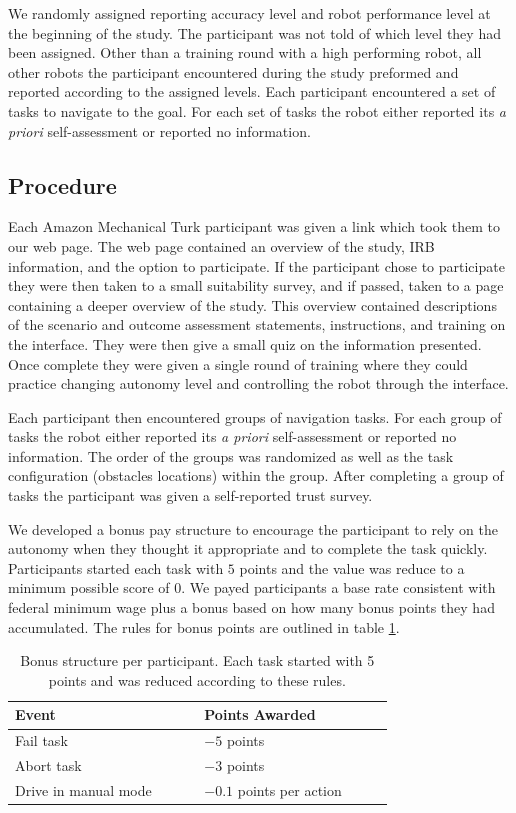 \documentclass[aaai]{article}
\begin{document}
We randomly assigned reporting accuracy level and robot performance level at the beginning of the study. The participant was not told of which level they had been assigned. Other than a training round with a high performing robot, all other robots the participant encountered during the study preformed and reported according to the assigned levels. Each participant encountered a set of tasks to navigate to the goal. For each set of tasks the robot either reported its \textit{a priori} self-assessment or reported no information.

\subsection{Procedure}
Each Amazon Mechanical Turk participant was given a link which took them to our web page. The web page contained an overview of the study, IRB information, and the option to participate. If the participant chose to participate they were then taken to a small suitability survey, and if passed, taken to a page containing a deeper overview of the study. This overview contained descriptions of the scenario and outcome assessment statements, instructions, and training on the interface. They were then give a small quiz on the information presented. Once complete they were given a single round of training where they could practice changing autonomy level and controlling the robot through the interface.

Each participant then encountered groups of navigation tasks. For each group of tasks the robot either reported its \textit{a priori} self-assessment or reported no information. The order of the groups was randomized as well as the task configuration (obstacles locations) within the group. After completing a group of tasks the participant was given a self-reported trust survey.

We developed a bonus pay structure to encourage the participant to rely on the autonomy when they thought it appropriate and to complete the task quickly. Participants started each task with $5$ points and the value was reduce to a minimum possible score of $0$. We payed participants a base rate consistent with federal minimum wage plus a bonus based on how many bonus points they had accumulated. The rules for bonus points are outlined in table \ref{BONUS}.

\begin{table}[h]
    \begin{center}
    \begin{tabular}{|p{0.4\linewidth} || p{0.4\linewidth}|}
    \hline
    \textbf{Event} & \textbf{Points Awarded} \\
    \hline
    \hline
    Fail task & $-5$ points\\
    \hline
    Abort task & $-3$ points \\
    \hline
    Drive in manual mode & $-0.1$ points per action \\
    \hline
    \end{tabular}
    \end{center}
    \caption{Bonus structure per participant. Each task started with 5 points and was reduced according to these rules.}
    \label{BONUS}
\end{table}
\end{document}
